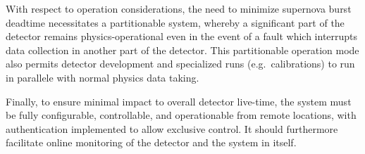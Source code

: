 With respect to operation considerations, the need to minimize
supernova burst deadtime necessitates a partitionable  system,
whereby a significant part of the detector remains physics-operational
even in the event of a fault which interrupts data collection in
another part of the detector. This partitionable operation mode also
permits detector development and specialized runs (e.g.~calibrations)
to run in parallele with normal physics data taking.

Finally, to ensure minimal impact to overall detector live-time, the  system must be fully configurable,
controllable, and operationable from remote locations, with
authentication implemented to allow exclusive control. It should
furthermore facilitate online monitoring of the detector and the 
system in itself.



%

